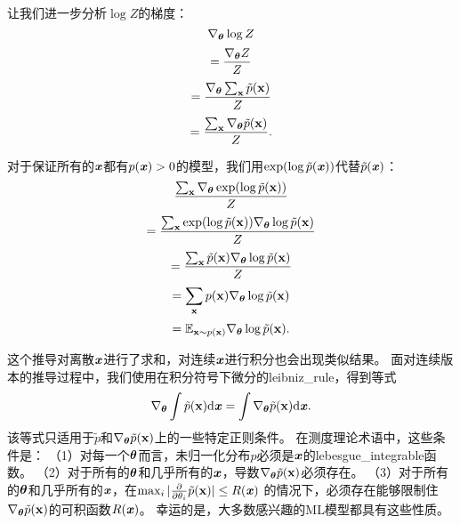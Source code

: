 让我们进一步分析$\log Z$的梯度：
\begin{equation}
	\nabla_{\boldsymbol{\theta}} \log Z
\end{equation}
\begin{equation}
	= \frac{ \nabla_{\boldsymbol{\theta}} Z }{Z}
\end{equation}
\begin{equation}
	= \frac{ \nabla_{\boldsymbol{\theta}} \sum_{\mathbf{x}} \tilde{p}(\mathbf{x}) }{Z}
\end{equation}
\begin{equation}
	= \frac{ \sum_{\mathbf{x}} \nabla_{\boldsymbol{\theta}} \tilde{p}(\mathbf{x}) }{Z}.
\end{equation}


对于保证所有的$\boldsymbol{\mathit{x}}$都有$p(\boldsymbol{\mathit{x}}) > 0$的模型，我们用$\exp(\log \tilde{p}(\boldsymbol{\mathit{x}}))$代替$\tilde{p}(\boldsymbol{\mathit{x}})$：
\begin{equation}
	\frac{ \sum_{\mathbf{x}} \nabla_{\boldsymbol{\theta}} \exp (\log \tilde{p} (\mathbf{x})) }{ Z }
\end{equation}
\begin{equation}
	= \frac{  \sum_{\mathbf{x}}  \exp (\log \tilde{p} (\mathbf{x})) \nabla_{\boldsymbol{\theta}} \log \tilde{p}(\mathbf{x})  }{Z}
\end{equation}
\begin{equation}
	=\frac{  \sum_{\mathbf{x}} \tilde{p} (\mathbf{x})  \nabla_{\boldsymbol{\theta}} \log \tilde{p}(\mathbf{x})  }{ Z}
\end{equation}
\begin{equation}
	=\sum_{\mathbf{x}} p(\mathbf{x}) \nabla_{\boldsymbol{\theta}} \log \tilde{p} ( \mathbf{x} )
 \end{equation}
\begin{equation}
	=\mathbb{E}_{\mathbf{x} \sim p(\mathbf{x})} \nabla_{\boldsymbol{\theta}} \log \tilde{p} (\mathbf{x}).
\end{equation}


这个推导对离散$\boldsymbol{\mathit{x}}$进行了求和，对连续$\boldsymbol{\mathit{x}}$进行积分也会出现类似结果。
面对连续版本的推导过程中，我们使用在积分符号下微分的\gls{leibniz_rule}，得到等式
\begin{equation}
	\nabla_{\boldsymbol{\theta}} \int \tilde{p} (\mathbf{x}) \mathrm{d} \boldsymbol{\mathit{x}}  = \int \nabla_{\boldsymbol{\theta}} 
\tilde{p} (\mathbf{x}) \mathrm{d} \boldsymbol{\mathit{x}}.
\end{equation}
该等式只适用于$\tilde{p}$和$\nabla_{\boldsymbol{\theta}} \tilde{p} (\mathbf{x})$上的一些特定正则条件。
在测度理论术语中，这些条件是：
（1）对每一个$\boldsymbol{\theta}$而言，未归一化分布$p$必须是$\boldsymbol{\mathit{x}}$的\gls{lebesgue_integrable}函数。
（2）对于所有的$\boldsymbol{\theta}$和几乎所有的$\boldsymbol{\mathit{x}}$，导数$\nabla_{\boldsymbol{\theta}} \tilde{p}(\mathbf{x})$必须存在。
（3）对于所有的$\boldsymbol{\theta}$和几乎所有的$\boldsymbol{\mathit{x}}$，在$\max_i | \frac{\partial}{\partial \theta_i } \tilde{p} (\mathbf{x}) | \leq R(\boldsymbol{\mathit{x}})$ 的情况下，必须存在能够限制住$\nabla_{\boldsymbol{\theta}} \tilde{p}(\mathbf{x})$的可积函数$R(\boldsymbol{\mathit{x}})$。
幸运的是，大多数感兴趣的\gls{ML}模型都具有这些性质。


